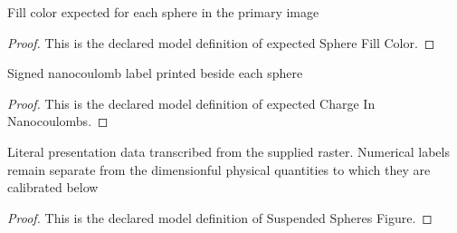 \begin{definition}
  \label{def:physics:phyx-mini-0906:phyxminiproblems-problemphyxmini0906-expectedspherefillcolor}
  Fill color expected for each sphere in the primary image
\end{definition}
\begin{proof}
  This is the declared model definition of expected Sphere Fill Color.
\end{proof}
\begin{definition}
  \label{def:physics:phyx-mini-0906:phyxminiproblems-problemphyxmini0906-expectedchargeinnanocoulombs}
  Signed nanocoulomb label printed beside each sphere
\end{definition}
\begin{proof}
  This is the declared model definition of expected Charge In Nanocoulombs.
\end{proof}
\begin{definition}
  \label{def:physics:phyx-mini-0906:phyxminiproblems-problemphyxmini0906-suspendedspheresfigure}
  Literal presentation data transcribed from the supplied raster. Numerical labels remain separate from the dimensionful physical quantities to which they are calibrated below
\end{definition}
\begin{proof}
  This is the declared model definition of Suspended Spheres Figure.
\end{proof}
